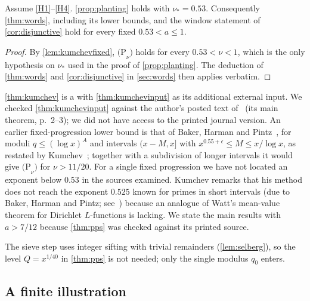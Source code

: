\documentclass[11pt]{article}
\begin{document}
\begin{theorem}\label{thm:kumchev}
Assume \ref{H1}--\ref{H4}. \cref{prop:planting} holds with $\nu_*=0.53$.
Consequently \cref{thm:words}, including its lower bounds, and the window
statement of \cref{cor:disjunctive} hold for every fixed $0.53<a\le1$.
\end{theorem}

\begin{proof}
By \cref{lem:kumchevfixed}, $\mathrm{(P}_\nu\mathrm{)}$ holds for every
$0.53<\nu<1$, which is the only hypothesis on $\nu_*$ used in the proof of
\cref{prop:planting}. The deduction of \cref{thm:words} and
\cref{cor:disjunctive} in \cref{sec:words} then applies verbatim.
\end{proof}

\cref{thm:kumchev} is a  with \cref{thm:kumchevinput} as
its additional external input. We checked \cref{thm:kumchevinput} against the
author's posted text of~\cite{Kumchev2002} (its main theorem, p.~2--3); we did
not have access to the printed journal version. An earlier fixed-progression
lower bound is that of Baker, Harman and Pintz~\cite[Theorem~3(I),
p.~4]{BHP1997}, for moduli $q\le(\log x)^A$ and intervals $(x-M,x]$ with
$x^{0.55+\epsilon}\le M\le x/\log x$, as restated by Kumchev~\cite[(1.3)]{Kumchev2002};
together with a subdivision of longer intervals it would give
$\mathrm{(P}_\nu\mathrm{)}$ for $\nu>11/20$. For a single fixed progression we
have not located an exponent below $0.53$ in the sources examined. Kumchev
remarks that his method does not reach the exponent $0.525$ known for primes in
short intervals (due to Baker, Harman and Pintz; see~\cite[\S1]{Kumchev2002}) because an analogue of Watt's mean-value theorem
for Dirichlet $L$-functions is lacking. We state the main results with $a>7/12$
because \cref{thm:pps} was checked against its printed source.

The sieve step uses integer sifting with trivial remainders
(\cref{lem:selberg}), so the level $Q=x^{1/40}$ in \cref{thm:pps} is not needed;
only the single modulus $q_0$ enters.

\subsection{A finite illustration}
\end{document}

